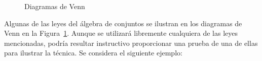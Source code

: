 \documentclass[
  us-letterpaper,
]{scrreprt}
\theoremstyle{plain}
\theoremstyle{definition}
\theoremstyle{definition}
\theoremstyle{plain}
\theoremstyle{remark}
\begin{document}
\begin{figure}


\caption{\label{fig-venn}Diagramas de Venn}

\end{figure}%

Algunas de las leyes del álgebra de conjuntos se ilustran en los
diagramas de Venn en la Figura~\ref{fig-venn}. Aunque se utilizará
libremente cualquiera de las leyes mencionadas, podría resultar
instructivo proporcionar una prueba de una de ellas para ilustrar la
técnica. Se considera el siguiente ejemplo:
\end{document}
